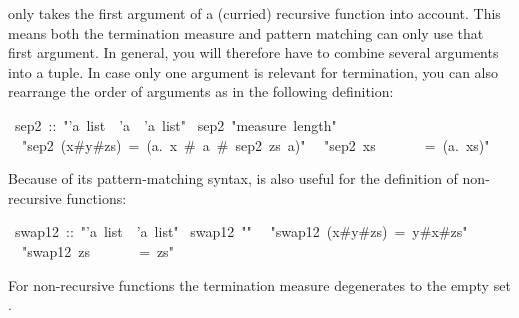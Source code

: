 \begin{isabelle}
\begin{isamarkuptext}
\begin{warn}
   only takes the first argument of a (curried)
  recursive function into account. This means both the termination measure
  and pattern matching can only use that first argument. In general, you will
  therefore have to combine several arguments into a tuple. In case only one
  argument is relevant for termination, you can also rearrange the order of
  arguments as in the following definition:
\end{warn}%
\end{isamarkuptext}%
\ sep2\ ::\ {"}'a\ list\ {\isasymRightarrow}\ 'a\ {\isasymRightarrow}\ 'a\ list{"}\isanewline
{}\ sep2\ {"}measure\ length{"}\isanewline
\ \ {"}sep2\ (x\#y\#zs)\ =\ ({\isasymlambda}a.\ x\ \#\ a\ \#\ sep2\ zs\ a){"}\isanewline
\ \ {"}sep2\ xs\ \ \ \ \ \ \ =\ ({\isasymlambda}a.\ xs){"}%
\begin{isamarkuptext}%
Because of its pattern-matching syntax,  is also useful
for the definition of non-recursive functions:%
\end{isamarkuptext}%
\ swap12\ ::\ {"}'a\ list\ {\isasymRightarrow}\ 'a\ list{"}\isanewline
{}\ swap12\ {"}{\isabraceleft}{\isabraceright}{"}\isanewline
\ \ {"}swap12\ (x\#y\#zs)\ =\ y\#x\#zs{"}\isanewline
\ \ {"}swap12\ zs\ \ \ \ \ \ \ =\ zs{"}%
\begin{isamarkuptext}%
\noindent
For non-recursive functions the termination measure degenerates to the empty
set \isa{\{\}}.%
\end{isamarkuptext}%
\end{isabelle}%
